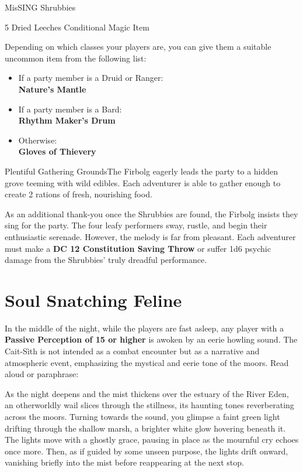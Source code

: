 \begin{DndQuestHook}[width=0.5\textwidth - 4pt]{{\large Mis}SING Shrubbies}
	{%
		{5 Dried Leeches}{}%
		{Conditional Magic Item}{%
			Depending on which classes your players are, you can give them a suitable uncommon item from the following list:
			\begin{itemize}
				\item If a party member is a Druid or Ranger:\\
				\textbf{Nature's Mantle}
				\item If a party member is a Bard:\\
				\textbf{Rhythm Maker's Drum}
				\item Otherwise:\\
				\textbf{Gloves of Thievery}
			\end{itemize}
		}%
		{Plentiful Gathering Grounds}{The Firbolg eagerly leads the party to a hidden grove teeming with wild edibles. Each adventurer is able to gather enough to create 2 rations of fresh, nourishing food.}
	}%
\end{DndQuestHook}

{\noindent\entryfont As an additional thank-you once the Shrubbies are found, the Firbolg insists they sing for the party. The four leafy performers sway, rustle, and begin their enthusiastic serenade. However, the melody is far from pleasant. Each adventurer must make a \textbf{DC 12 Constitution Saving Throw} or suffer 1d6 psychic damage from the Shrubbies' truly dreadful performance.}

\section*{Soul Snatching Feline}
{\entryfont In the middle of the night, while the players are fast asleep, any player with a \textbf{Passive Perception of 15 or higher} is awoken by an eerie howling sound. The Cait-Sìth is not intended as a combat encounter but as a narrative and atmospheric event, emphasizing the mystical and eerie tone of the moors. Read aloud or paraphrase:}
\begin{DndReadAloud}
	As the night deepens and the mist thickens over the estuary of the River Eden, an otherworldly wail slices through the stillness, its haunting tones reverberating across the moors. Turning towards the sound, you glimpse a faint green light drifting through the shallow marsh, a brighter white glow hovering beneath it. The lights move with a ghostly grace, pausing in place as the mournful cry echoes once more. Then, as if guided by some unseen purpose, the lights drift onward, vanishing briefly into the mist before reappearing at the next stop.
\end{DndReadAloud}

